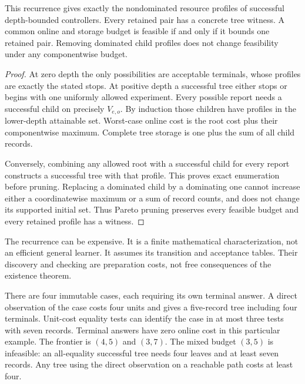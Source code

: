 \begin{Coretheorem}\label{Core:r:inquiry}
This recurrence gives exactly the nondominated resource profiles of successful depth-bounded controllers. Every retained pair has a concrete tree witness. A common online and storage budget is feasible if and only if it bounds one retained pair. Removing dominated child profiles does not change feasibility under any componentwise budget.
\end{Coretheorem}
\begin{proof}
At zero depth the only possibilities are acceptable terminals, whose profiles are exactly the stated stops. At positive depth a successful tree either stops or begins with one uniformly allowed experiment. Every possible report needs a successful child on precisely $V_{e,o}$. By induction those children have profiles in the lower-depth attainable set. Worst-case online cost is the root cost plus their componentwise maximum. Complete tree storage is one plus the sum of all child records.

Conversely, combining any allowed root with a successful child for every report constructs a successful tree with that profile. This proves exact enumeration before pruning. Replacing a dominated child by a dominating one cannot increase either a coordinatewise maximum or a sum of record counts, and does not change its supported initial set. Thus Pareto pruning preserves every feasible budget and every retained profile has a witness.
\end{proof}

The recurrence can be expensive. It is a finite mathematical characterization, not an efficient general learner. It assumes its transition and acceptance tables. Their discovery and checking are preparation costs, not free consequences of the existence theorem.

\begin{Corecounterexample}\label{Core:ce:pareto}
There are four immutable cases, each requiring its own terminal answer. A direct observation of the case costs four units and gives a five-record tree including four terminals. Unit-cost equality tests can identify the case in at most three tests with seven records. Terminal answers have zero online cost in this particular example. The frontier is $(4,5)$ and $(3,7)$. The mixed budget $(3,5)$ is infeasible: an all-equality successful tree needs four leaves and at least seven records. Any tree using the direct observation on a reachable path costs at least four.
\end{Corecounterexample}

